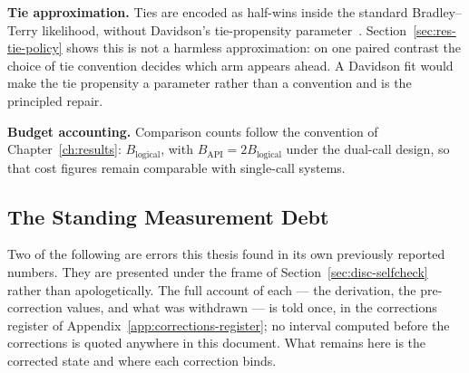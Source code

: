 \textbf{Tie approximation.}
Ties are encoded as half-wins inside the standard Bradley--Terry
likelihood, without Davidson's tie-propensity
parameter~\parencite{davidson1970ties}. Section~\ref{sec:res-tie-policy}
shows this is not a harmless approximation: on one paired contrast the
choice of tie convention decides which arm appears ahead. A Davidson
fit would make the tie propensity a parameter rather than a convention
and is the principled repair.

\textbf{Budget accounting.}
Comparison counts follow the convention of Chapter~\ref{ch:results}:
$B_{\text{logical}}$, with $B_{\text{API}} = 2 B_{\text{logical}}$
under the dual-call design, so that cost figures remain comparable
with single-call systems.

\subsection{The Standing Measurement Debt}\label{sec:disc-limitations}\label{sec:discussion-limitations}\label{sec:disc-debt}

Two of the following are errors this thesis found in its own
previously reported numbers. They are presented under the frame of
Section~\ref{sec:disc-selfcheck} rather than apologetically. The full
account of each --- the derivation, the pre-correction values, and
what was withdrawn --- is told once, in the corrections register of
Appendix~\ref{app:corrections-register}; no interval computed before
the corrections is quoted anywhere in this document. What remains here
is the corrected state and where each correction binds.

